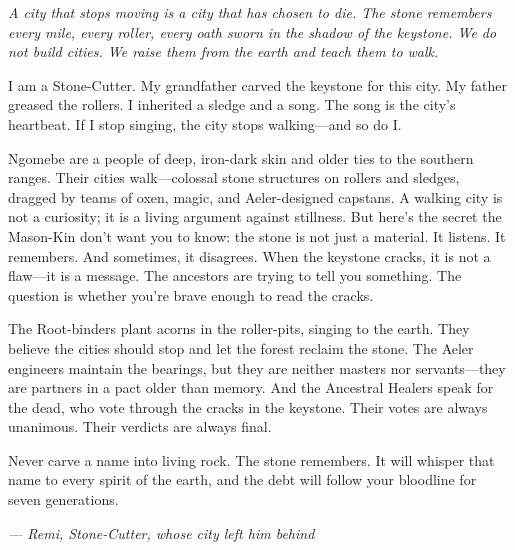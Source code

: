 \noindent
{\Large
\textit{A city that stops moving is a city that has chosen to die. The stone remembers every mile, every roller, every oath sworn in the shadow of the keystone. We do not build cities. We raise them from the earth and teach them to walk.}

\vspace{0.5em}

I am a Stone-Cutter. My grandfather carved the keystone for this city. My father greased the rollers. I inherited a sledge and a song. The song is the city's heartbeat. If I stop singing, the city stops walking---and so do I.

\vspace{0.5em}

Ngomebe are a people of deep, iron-dark skin and older ties to the southern ranges. Their cities walk---colossal stone structures on rollers and sledges, dragged by teams of oxen, magic, and Aeler-designed capstans. A walking city is not a curiosity; it is a living argument against stillness. But here's the secret the Mason-Kin don't want you to know: the stone is not just a material. It listens. It remembers. And sometimes, it disagrees. When the keystone cracks, it is not a flaw---it is a message. The ancestors are trying to tell you something. The question is whether you're brave enough to read the cracks.

\vspace{0.5em}

The Root-binders plant acorns in the roller-pits, singing to the earth. They believe the cities should stop and let the forest reclaim the stone. The Aeler engineers maintain the bearings, but they are neither masters nor servants---they are partners in a pact older than memory. And the Ancestral Healers speak for the dead, who vote through the cracks in the keystone. Their votes are always unanimous. Their verdicts are always final.

\vspace{0.5em}

Never carve a name into living rock. The stone remembers. It will whisper that name to every spirit of the earth, and the debt will follow your bloodline for seven generations.

\vspace{1em}

\noindent\textit{--- Remi, Stone-Cutter, whose city left him behind}
}

\vspace{1em}

